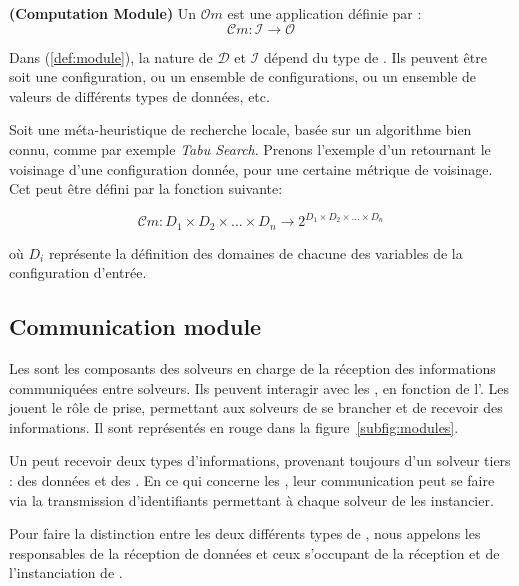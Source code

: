 \documentclass{jfpc-preprint}
\begin{document}
\begin{definition}\label{def:module} \textbf{(Computation Module)}
Un \om{} $\mathcal{O}m$ est une application définie par :
\begin{equation}
 \mathcal{C}m:\mathcal{I} \rightarrow \mathcal{O}
\end{equation}
\end{definition}

Dans (\ref{def:module}),  la nature de $\mathcal{D}$  et $\mathcal{I}$ dépend du type de \om{}.  Ils peuvent être soit une configuration, ou  un  ensemble de  configurations, ou un ensemble de  valeurs  de différents types de données, etc.

Soit une méta-heuristique de recherche locale, basée sur un algorithme bien connu, comme par exemple {\it Tabu Search}. Prenons l'exemple d'un  \om{} retournant  le voisinage  d'une configuration  donnée, pour une certaine métrique de voisinage. Cet \om{} peut être défini par la fonction suivante:

\begin{equation}
\mathcal{C}m:D_1\times D_2\times\dots\times D_n \rightarrow 2^{D_1\times D_2\times\dots\times D_n}
\end{equation}

où $D_i$  représente  la  définition  des  domaines  de  chacune  des variables de la configuration d'entrée.

\subsection{Communication module}

Les \opchs{} sont  les composants des solveurs en charge  de la réception des informations  communiquées entre  solveurs. Ils  peuvent interagir
avec les  \oms, en fonction de l'\as. Les \opchs{} jouent  le rôle de prise, permettant aux  solveurs de  se  brancher et  de recevoir  des informations. Il sont représentés en rouge dans la figure~\ref{subfig:modules}.

Un \opch{} peut recevoir deux types d'informations, provenant toujours d'un solveur tiers : des données et des \oms. En  ce qui concerne les \oms, leur  communication peut  se faire  via la  transmission d'identifiants permettant à chaque solveur de les instancier.

Pour faire  la distinction entre  les deux différents types  de \opchs, nous appelons \INTROdopch{} les \opchs{} responsables de la réception de données  et \INTROoopch{} ceux s'occupant de la réception et de l'instanciation de \oms.
\end{document}
